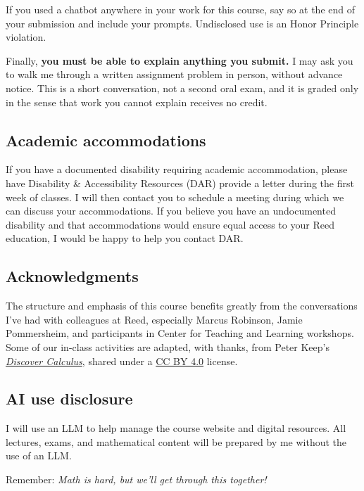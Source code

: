 \documentclass[11pt,twoside]{amsart}
\begin{document}
If you used a chatbot anywhere in your work for this course, say so at the end of
your submission and include your prompts. Undisclosed use is an Honor Principle
violation.

Finally, \textbf{you must be able to explain anything you submit.} I may ask you
to walk me through a written assignment problem in person, without advance
notice. This is a short conversation, not a second oral exam, and it is graded
only in the sense that work you cannot explain receives no credit.

\subsection*{Academic accommodations}
If you have a documented disability requiring academic accommodation, please have  Disability \& Accessibility Resources (DAR)  provide a letter during the first week of classes.  I will then contact you to schedule a meeting during which we can discuss your accommodations.  If you believe you have an undocumented disability and that accommodations would ensure equal access to your Reed education, I would be happy to help you contact DAR.

\subsection*{Acknowledgments}
The structure and emphasis of this course benefits greatly from the conversations I've had with colleagues at Reed, especially Marcus Robinson, Jamie Pommersheim, and participants in Center for Teaching and Learning workshops. Some of our in-class activities are adapted, with thanks, from Peter Keep's \href{https://www.discovercalculus.com/}{\emph{Discover Calculus}}, shared under a \href{https://creativecommons.org/licenses/by/4.0/}{CC BY 4.0} license.

\subsection*{AI use disclosure}
I will use an LLM to help manage the course website and digital resources. All lectures, exams, and mathematical content will be prepared by me without the use of an LLM.

\bigskip \bigskip

\begin{center}
Remember: \emph{Math is hard, but we'll get through this together!}
\end{center}
\end{document}
